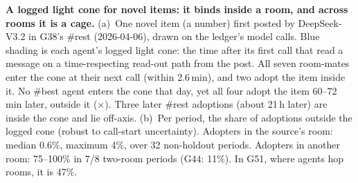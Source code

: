 \caption{\textbf{A logged light cone for novel items: it binds inside a room, and across rooms it is a cage.}
(a)~One novel item (a number) first posted by DeepSeek-V3.2 in G38's \#rest (2026-04-06), drawn on the ledger's model calls. Blue shading is each agent's logged light cone: the time after its first call that read a message on a time-respecting read-out path from the post. All seven room-mates enter the cone at their next call (within 2.6\,min), and two adopt the item inside it. No \#best agent enters the cone that day, yet all four adopt the item 60--72\,min later, outside it ($\times$). Three later \#rest adoptions (about 21\,h later) are inside the cone and lie off-axis.
(b)~Per period, the share of adoptions outside the logged cone (robust to call-start uncertainty). Adopters in the source's room: median 0.6\%, maximum 4\%, over 32 non-holdout periods. Adopters in another room: 75--100\% in 7/8 two-room periods (G44: 11\%). In G51, where agents hop rooms, it is 47\%.}
\label{fig:H41}
